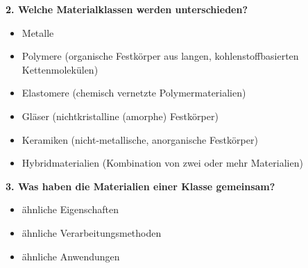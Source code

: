 \noindent\textbf{2. Welche Materialklassen werden unterschieden?}
\indent \begin{itemize}
    \item Metalle
    \item Polymere (organische Festkörper aus langen, kohlenstoffbasierten Kettenmolekülen)
    \item Elastomere (chemisch vernetzte Polymermaterialien)
    \item Gläser (nichtkristalline (amorphe) Festkörper)
    \item Keramiken (nicht-metallische, anorganische Festkörper)
    \item Hybridmaterialien (Kombination von zwei oder mehr Materialien)
\end{itemize}
\newpage
\noindent\textbf{3. Was haben die Materialien einer Klasse gemeinsam?}
\indent \begin{itemize}
    \item ähnliche Eigenschaften
    \item ähnliche Verarbeitungsmethoden
    \item ähnliche Anwendungen
\end{itemize}


